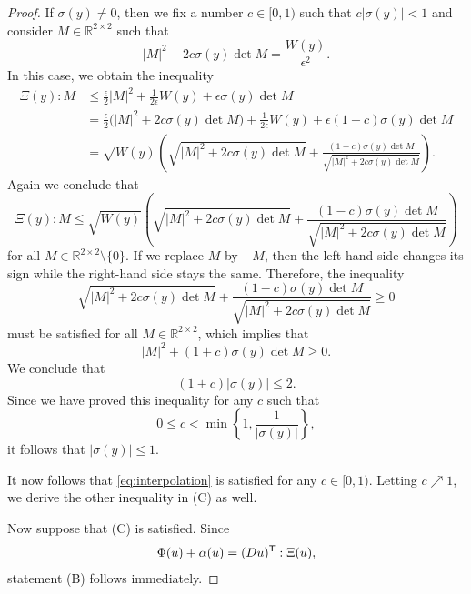 \documentclass[a4paper]{article}
\newcommand{\R}{\mathbb{R}}
\newcommand{\transpose}{\mathsf{T}}
\let\div\relax\DeclareMathOperator{\div}{div}
\theoremstyle{definition}
\theoremstyle{remark}
\begin{document}
\begin{proof}
If $\sigma(y) \neq 0$, then we fix a number $c \in [0, 1)$ such that
$c |\sigma(y)| < 1$ and consider $M \in \R^{2 \times 2}$ such that
\[
|M|^2 + 2c \sigma(y) \det M = \frac{W(y)}{\epsilon^2}.
\]
In this case, we obtain the inequality
\[
\begin{split}
\Xi(y) : M & \le \frac{\epsilon}{2} |M|^2 + \frac{1}{2\epsilon} W(y) + \epsilon \sigma(y) \det M \\
& = \frac{\epsilon}{2} \bigl(|M|^2 + 2c \sigma(y) \det M\bigr) + \frac{1}{2\epsilon} W(y) + \epsilon (1 - c)\sigma(y) \det M \\
& = \sqrt{W(y)} \left(\sqrt{|M|^2 + 2c \sigma(y) \det M} + \frac{(1 - c) \sigma(y) \det M}{\sqrt{|M|^2 + 2c \sigma(y) \det M}}\right).
\end{split}
\]
Again we conclude that
\begin{equation} \label{eq:interpolation}
\Xi(y) : M \le \sqrt{W(y)} \left(\sqrt{|M|^2 + 2c \sigma(y) \det M} + \frac{(1 - c) \sigma(y) \det M}{\sqrt{|M|^2 + 2c \sigma(y) \det M}}\right)
\end{equation}
for all $M \in \R^{2 \times 2} \setminus \{0\}$. If we replace $M$ by $-M$, then the left-hand
side changes its sign while the right-hand side stays the same. Therefore,
the inequality
\[
\sqrt{|M|^2 + 2c \sigma(y) \det M} + \frac{(1 - c) \sigma(y) \det M}{\sqrt{|M|^2 + 2c \sigma(y) \det M}} \ge 0
\]
must be satisfied for all $M \in \R^{2 \times 2}$, which implies that
\[
|M|^2 + (1 + c) \sigma(y) \det M \ge 0.
\]
We conclude that
\[
(1 + c) |\sigma(y)| \le 2.
\]
Since we have proved this inequality for any $c$ such that
\[
0 \le c < \min\left\{1, \frac{1}{|\sigma(y)|}\right\},
\]
it follows that $|\sigma(y)| \le 1$.

It now follows that \eqref{eq:interpolation} is satisfied for any
$c \in [0, 1)$. Letting $c \nearrow 1$, we derive the other inequality in
(C) as well.

Now suppose that (C) is satisfied. Since
\[
\div \Phi(u) + \alpha(u) = (Du)^\transpose : \Xi(u),
\]
statement (B) follows immediately.
\end{proof}
\end{document}
